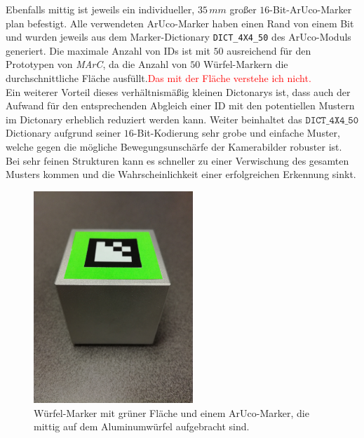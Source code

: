 Ebenfalls mittig ist jeweils ein individueller, $35\,mm$ großer $16$-Bit-ArUco-Marker plan befestigt. Alle verwendeten ArUco-Marker haben einen Rand von einem Bit und wurden jeweils aus dem Marker-Dictionary \texttt{DICT\_4X4\_50} des ArUco-Moduls \cite{website:ArucoDoc} generiert. Die maximale Anzahl von IDs ist mit $50$ ausreichend für den Prototypen von \textit{MArC}, da die Anzahl von $50$ Würfel-Markern die durchschnittliche Fläche ausfüllt.\textcolor{red}{Das mit der Fläche verstehe ich nicht.}\\ 
Ein weiterer Vorteil dieses verhältnismäßig kleinen Dictonarys ist, dass auch der Aufwand für den entsprechenden Abgleich einer ID mit den potentiellen Mustern im Dictonary erheblich reduziert werden kann. 
Weiter beinhaltet das $\texttt{DICT\_4X4\_50}$ Dictionary aufgrund seiner $16$-Bit-Kodierung sehr grobe und einfache Muster, welche gegen die mögliche Bewegungsunschärfe der Kamerabilder robuster ist. Bei sehr feinen Strukturen kann es schneller zu einer Verwischung des gesamten Musters kommen und die Wahrscheinlichkeit einer erfolgreichen Erkennung sinkt.

\begin{figure}[H] 
	\center 
	\includegraphics[trim = 0mm 280mm 0mm 150mm, clip, width=6cm]{Bilder/tracking-marker.jpg}			
	\caption{Würfel-Marker mit grüner Fläche und einem ArUco-Marker, die mittig auf dem Aluminumwürfel aufgebracht sind.}
	\label{fig:marker}
\end{figure}

